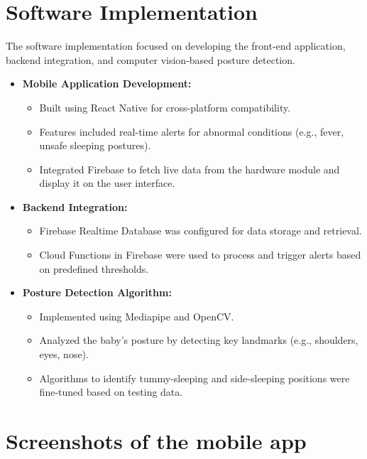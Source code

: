 \documentclass[12pt,a4paper]{report}
\begin{document}
\section{Software Implementation}
The software implementation focused on developing the front-end application, backend integration, and computer vision-based posture detection.
\begin{itemize}
  \item \textbf{Mobile Application Development:}
   \begin{itemize}
    \item Built using React Native for cross-platform compatibility.
    \item Features included real-time alerts for abnormal conditions (e.g., fever, unsafe sleeping postures).
    \item Integrated Firebase to fetch live data from the hardware module and display it on the user interface.
  \end{itemize}
  \item \textbf{Backend Integration:}
  \begin{itemize}
    \item Firebase Realtime Database was configured for data storage and retrieval.
    \item Cloud Functions in Firebase were used to process and trigger alerts based on predefined thresholds.
  \end{itemize}
  \item \textbf{Posture Detection Algorithm:}
  \begin{itemize}
    \item Implemented using Mediapipe and OpenCV.
    \item Analyzed the baby's posture by detecting key landmarks (e.g., shoulders, eyes, nose).
    \item Algorithms to identify tummy-sleeping and side-sleeping positions were fine-tuned based on testing data.
  \end{itemize}
\end{itemize}
\section{Screenshots of the mobile app}
\end{document}
